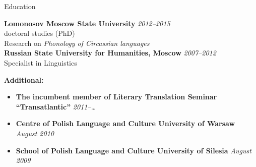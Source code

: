 \documentclass{resume} %
\begin{document}

\begin{rSection}{Education}

{\bf Lomonosov Moscow State University} \hfill {\em 2012--2015} \\ 
doctoral studies (PhD)\\
Research on \textit{Phonology of Circassian languages}\\
{\bf Russian State University for Humanities, Moscow} \hfill {\em 2007--2012} \\ 
Specialist in Linguistics

{\bf Additional:}
\begin{itemize}
\item {\bf The incumbent member of Literary Translation Seminar ``Transatlantic''} \hfill {\em 2011--\ldots}
\item {\bf Centre of Polish Language and Culture University of Warsaw} \hfill {\em August 2010}
\item {\bf School of Polish Language and Culture University of Silesia} \hfill {\em August 2009}
\end{itemize}

\end{rSection}

\end{document}
